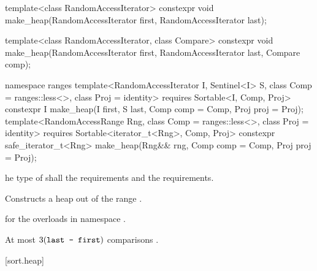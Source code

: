 %
\begin{itemdecl}
template<class RandomAccessIterator>
  constexpr void make_heap(RandomAccessIterator first, RandomAccessIterator last);

template<class RandomAccessIterator, class Compare>
  constexpr void make_heap(RandomAccessIterator first, RandomAccessIterator last,
                           Compare comp);
\end{itemdecl}
\begin{addedblock}
\begin{itemdecl}
namespace ranges {
  template<RandomAccessIterator I, Sentinel<I> S, class Comp = ranges::less<>,
      class Proj = identity>
    requires Sortable<I, Comp, Proj>
    constexpr I
      make_heap(I first, S last, Comp comp = Comp{}, Proj proj = Proj{});
  template<RandomAccessRange Rng, class Comp = ranges::less<>, class Proj = identity>
    requires Sortable<iterator_t<Rng>, Comp, Proj>
    constexpr safe_iterator_t<Rng>
      make_heap(Rng&& rng, Comp comp = Comp{}, Proj proj = Proj{});
}
\end{itemdecl}
\end{addedblock}

\begin{itemdescr}
\pnum
\requires
{}he type of
 shall 
the  requirements
and the  requirements.

\pnum
\effects
Constructs a heap out of the range
.

\begin{addedblock}
\pnum
\returns
{} for the overloads in namespace .
\end{addedblock}

\pnum
\complexity
At most
$3(\texttt{last - first})$
comparisons .
\end{itemdescr}


[sort.heap]{}

